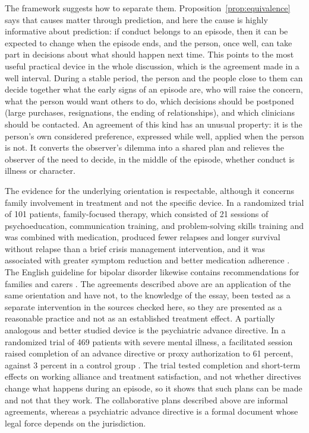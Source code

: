 \documentclass[11pt]{article}
\theoremstyle{definition}
\theoremstyle{remark}
\begin{document}
The framework suggests how to separate them. Proposition~\ref{prop:equivalence} says that causes matter through prediction, and here the cause is highly informative about prediction: if conduct belongs to an episode, then it can be expected to change when the episode ends, and the person, once well, can take part in decisions about what should happen next time. This points to the most useful practical device in the whole discussion, which is the agreement made in a well interval. During a stable period, the person and the people close to them can decide together what the early signs of an episode are, who will raise the concern, what the person would want others to do, which decisions should be postponed (large purchases, resignations, the ending of relationships), and which clinicians should be contacted. An agreement of this kind has an unusual property: it is the person's own considered preference, expressed while well, applied when the person is not. It converts the observer's dilemma into a shared plan and relieves the observer of the need to decide, in the middle of the episode, whether conduct is illness or character.

The evidence for the underlying orientation is respectable, although it concerns family involvement in treatment and not the specific device. In a randomized trial of 101 patients, family-focused therapy, which consisted of 21 sessions of psychoeducation, communication training, and problem-solving skills training and was combined with medication, produced fewer relapses and longer survival without relapse than a brief crisis management intervention, and it was associated with greater symptom reduction and better medication adherence \citep{miklowitz2003}. The English guideline for bipolar disorder likewise contains recommendations for families and carers \citep{nice185}. The agreements described above are an application of the same orientation and have not, to the knowledge of the essay, been tested as a separate intervention in the sources checked here, so they are presented as a reasonable practice and not as an established treatment effect. A partially analogous and better studied device is the psychiatric advance directive. In a randomized trial of 469 patients with severe mental illness, a facilitated session raised completion of an advance directive or proxy authorization to 61 percent, against 3 percent in a control group \citep{swanson2006}. The trial tested completion and short-term effects on working alliance and treatment satisfaction, and not whether directives change what happens during an episode, so it shows that such plans can be made and not that they work. The collaborative plans described above are informal agreements, whereas a psychiatric advance directive is a formal document whose legal force depends on the jurisdiction.
\end{document}

